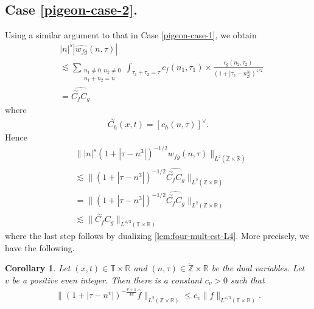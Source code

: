 \documentclass[12pt,reqno]{amsart}
\numberwithin{equation}{section}  %
\numberwithin{figure}{section}
\newcommand{\rr}{\mathbb{R}}
\newcommand{\zz}{\mathbb{Z}}
\newcommand{\ci}{\mathbb{T}}
\newcommand{\zzdot}{\dot{\zz}}
\newcommand{\wh}{\widehat}
\theoremstyle{plain}
\newtheorem{corollary}{Corollary}
\theoremstyle{definition}
\theoremstyle{remark}
\begin{document}
\subsection{Case \eqref{pigeon-case-2}.}
Using a similar argument to that in Case \eqref{pigeon-case-1}, we obtain
%
%
\begin{equation}
	\label{1f}
	\begin{split}
		& |n|^s  | \wh{w_{fg}}\left( 
		n, \tau \right) |
		\\
		& \lesssim 
		\sum_{\substack{n_1 \neq0, n_2 \neq 0 \\n_1 + n_2 =n}} \int_{\tau_1 + \tau_2 = \tau}		c_f(n_1, \tau_1)
		\times
		\frac{c_g(n_2, \tau_2)}{\left( 1 + | \tau_2 - n_2^3 | 
		\right)^{1/2}} 
		\\
		& = \wh{\overset{\sim}{C_f} C_g}
	\end{split}
\end{equation}
%
where
%
%
\begin{equation*}
	\begin{split}
		\overset{\sim}{C_h}(x,t) = \left[ c_h(n, \tau) \right]^\vee.
	\end{split}
\end{equation*}
%
%
Hence
%
\begin{equation}
	\label{3f}
	\begin{split}
		& \| |n|^s \left( 1 + | \tau - n^3 | \right)^{-1/2} \wh{w_{fg}}(n, \tau) 
		\|_{L^2(\zzdot \times \rr)}
		\\
		& \lesssim \|\left( 1 + | \tau - n^{3} | \right)^{-1/2} 
		\wh{\overset{\sim}{C_f} C_g } \|_{L^2(\zzdot \times \rr)}
		\\
		& =  \|\left( 1 + | \tau - n^{3} | \right)^{-1/2} 
		\wh{\overset{\sim}{C_f} C_g } \|_{L^2(\zz \times \rr)}
		\\
		& \lesssim  \|\overset{\sim}{C_f} C_g  \|_{L^{4/3}(\ci \times \rr)}
	\end{split}
\end{equation}
%
where the last step follows by dualizing \autoref{lem:four-mult-est-L4}. More
precisely, we have the following.
\begin{corollary}
	\label{cor:four-mult-est-L4}
	Let $(x, t) \in \ci \times \rr $ and $(n, \tau) \in \zzdot \times \rr$ be 
	the dual variables. Let $v$ be a positive even integer. Then there is a 
	constant $c_v > 0$ such that
%
%
\begin{equation}
	\label{four-mult-est-L4*}
	\begin{split}
		\| \left( 1 + | \tau - n^v | 
		\right)^{-\frac{v+1}{4v}}
		\wh{f}\|_{L^2(\zz \times \rr)} \le c_v \|f \|_{L^{4/3}( \ci \times \rr)}.
	\end{split}
\end{equation}
%
%
\end{corollary}
\end{document}
